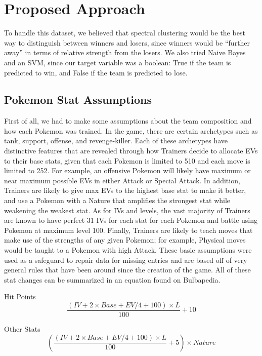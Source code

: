 \documentclass{acm_proc_article-sp}
\begin{document}
\section{Proposed Approach}
To handle this dataset, we believed that spectral clustering would be the best way to distinguish between winners and losers, since winners would be “further away” in terms of relative strength from the losers. We also tried Naive Bayes and an SVM, since our target variable was a boolean: True if the team is predicted to win, and False if the team is predicted to lose.

\subsection{Pokemon Stat Assumptions}
First of all, we had to make some assumptions about the team composition and how each Pokemon was trained. In the game, there are certain archetypes such as tank, support, offense, and revenge-killer. Each of these archetypes have distinctive features that are revealed through how Trainers decide to allocate EVs to their base stats, given that each Pokemon is limited to 510 and each move is limited to 252. For example, an offensive Pokemon will likely have maximum or near maximum possible EVs in either Attack or Special Attack. In addition, Trainers are likely to give max EVs to the highest base stat to make it better, and use a Pokemon with a Nature that amplifies the strongest stat while weakening the weakest stat. As for IVs and levels, the vast majority of Trainers are known to have perfect 31 IVs for each stat for each Pokemon and battle using Pokemon at maximum level 100. Finally, Trainers are likely to teach moves that make use of the strengths of any given Pokemon; for example, Physical moves would be taught to a Pokemon with high Attack. These basic assumptions were used as a safeguard to repair data for missing entries and are based off of very general rules that have been around since the creation of the game. All of these stat changes can be summarized in an equation found on Bulbapedia.

Hit Points
\begin{equation}\frac{(IV + 2 \times Base + EV/4 + 100) \times L}{100} + 10
\end{equation}

Other Stats
\begin{equation}(\frac{(IV + 2 \times Base + EV/4 + 100) \times L}{100} + 5) \times Nature
\end{equation}
\end{document}
